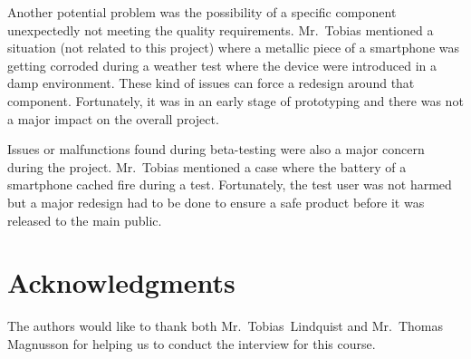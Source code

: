 \documentclass[conference]{IEEEtran}
\begin{document}
Another potential problem was the possibility of a specific component unexpectedly not meeting the quality requirements. Mr.~Tobias mentioned a situation (not related to this project) where a metallic piece of a smartphone was getting corroded during a weather test where the device were introduced in a damp environment. These kind of issues can force a redesign around that component. Fortunately, it was in an early stage of prototyping and there was not a major impact on the overall project.

Issues or malfunctions found during beta-testing were also a major concern during the project. Mr.~Tobias mentioned a case where the battery of a smartphone cached fire during a test. Fortunately, the test user was not harmed but a major redesign had to be done to ensure a safe product before it was released to the main public.

\section*{Acknowledgments}
The authors would like to thank both  Mr.~Tobias~Lindquist and Mr.~Thomas Magnusson for helping us to conduct the interview for this course.
\end{document}
